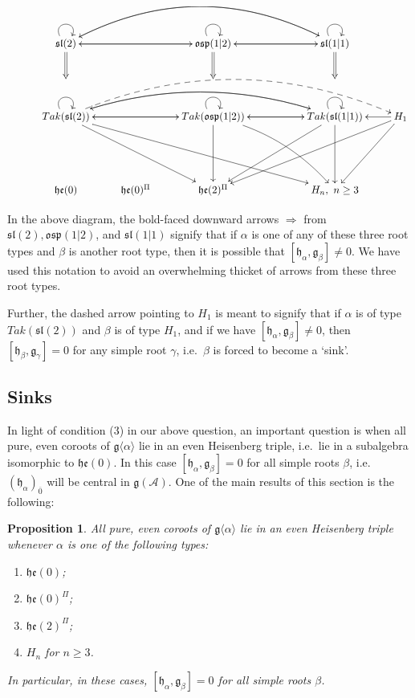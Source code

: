 \documentclass[12pt, a4paper, reqno]{amsart}
\def\AA{\mathcal{A}}
\def\e{\mathfrak{e}}
\def\p{\mathfrak{p}}
\def\g{\mathfrak{g}}
\def\h{\mathfrak{h}}
\def\l{\mathfrak{l}}
\def\s{\mathfrak{s}}
\def\o{\mathfrak{o}}
\def\ol{\overline}
\newtheorem{proposition}{Proposition}
\theoremstyle{definition}
\theoremstyle{definition}
\theoremstyle{definition}
\numberwithin{theorem}{section}
\numberwithin{lemma}{section}
\numberwithin{remark}{section}
\numberwithin{definition}{section}
\numberwithin{corollary}{section}
\numberwithin{proposition}{section}
\numberwithin{example}{section}
\begin{document}
	\
	
	\
	
	\[
	\xymatrix{
		&\s\l(2) \ar[rr] \ar@(ul,ur) \ar@{=>}[d] \ar@/^3pc/[rrrr] & & \ar[ll]  \o\s\p(1|2) \ar@(ul,ur) \ar@{=>}[d]\ar[rr] & & \ar@/_3pc/[llll]  \ar[ll] \s\l(1|1) \ar@(ul,ur) \ar@{=>}[d] & \\
		&&&&&&\\ 
		&Tak(\s\l(2)) \ar@/^3pc/@{-->}[rrrrr] \ar@(ul,ur) \ar[rr] \ar[rrdd] \ar[rrrrdd] \ar@/^2pc/[rrrr] & & \ar[ll] Tak(\o\s\p(1|2)) \ar@(ul,ur) \ar[dd] \ar@/^1pc/[ddrr]\ar[rr] & & \ar@/_2pc/[llll] \ar[ll] \ar[dd] \ar[ddll] Tak(\s\l(1|1)) \ar@(ul,ur) & \ar[l]\ar[ddl]\ar[ddlll]H_1 \\
		&&&&&&\\
		& \h\e(0) & \h\e(0)^{\Pi} & \h\e(2)^{\Pi} & & H_n, \ n\geq 3 &
	}
	\]
	
	In the above diagram, the bold-faced downward arrows $\Rightarrow$ from $\s\l(2),\o\s\p(1|2)$, and $\s\l(1|1)$ signify that if $\alpha$ is one of any of these three root types and $\beta$ is another root type, then it is possible that $[\h_{\alpha},\g_{\beta}]\neq0$.  We have used this notation to avoid an overwhelming thicket of arrows from these three root types.
	
	Further, the dashed arrow pointing to $H_1$ is meant to signify that if $\alpha$ is of type $Tak(\s\l(2))$ and $\beta$ is of type $H_1$, and if we have $[\h_{\alpha},\g_{\beta}]\neq0$, then $[\h_{\beta},\g_{\gamma}]=0$ for any simple root $\gamma$, i.e.~$\beta$ is forced to become a `sink'.  
	
	\subsection{Sinks} In light of condition (3) in our above question, an important question is when all pure, even coroots of $\g\langle\alpha\rangle$ lie in an even Heisenberg triple, i.e.~lie in a subalgebra isomorphic to $\h\e(0)$.  In this case $[\h_{\alpha},\g_{\beta}]=0$ for all simple roots $\beta$, i.e.~$(\h_{\alpha})_{\ol{0}}$ will be central in $\g(\AA)$. One of the main results of this section is the following:
	
	\begin{proposition}\label{prop_sinks}
		All pure, even coroots of $\g\langle\alpha\rangle$ lie in an even Heisenberg triple whenever $\alpha$ is one of the following types:
		\begin{enumerate}
			\item $\h\e(0)$;
			\item $\h\e(0)^{\Pi}$;
			\item $\h\e(2)^{\Pi}$;
			\item $H_n$ for $n\geq 3$.
		\end{enumerate}
		In particular, in these cases, $[\h_{\alpha},\g_{\beta}]=0$ for all simple roots $\beta$.  
	\end{proposition}
	
\end{document}
